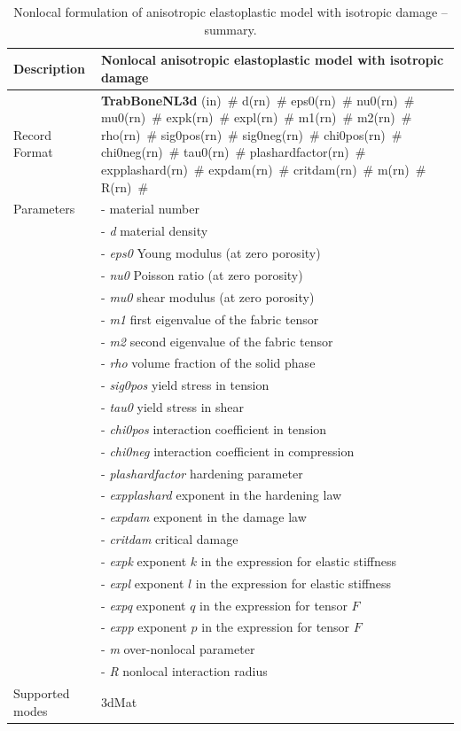 \documentclass[a4paper]{article}
\newcommand{\mbf}[1]{\mbox{\boldmath$#1$}}
\newcommand{\descitem}[1]{{\noindent \bf #1}}
\newcommand{\elemparam}[2]{{{#1\tiny (#2)}~\#}}
\newcommand{\param}[1]{{\it #1}}
\begin{document}
\begin{table}[!htb]
\begin{tabular}{|l|p{9cm}|}
\hline
Description & Nonlocal anisotropic elastoplastic model with isotropic damage\\
\hline
Record Format & \descitem{TrabBoneNL3d}  \elemparam{}{in}
\elemparam{d}{rn} \elemparam{eps0}{rn} \elemparam{nu0}{rn} \elemparam{mu0}{rn} \elemparam{expk}{rn} \elemparam{expl}{rn} \elemparam{m1}{rn} \elemparam{m2}{rn} \elemparam{rho}{rn}
\elemparam{sig0pos}{rn} \elemparam{sig0neg}{rn} \elemparam{chi0pos}{rn} \elemparam{chi0neg}{rn} \elemparam{tau0}{rn} \elemparam{plashardfactor}{rn} \elemparam{expplashard}{rn} \elemparam{expdam}{rn} \elemparam{critdam}{rn} \elemparam{m}{rn} \elemparam{R}{rn}\\
Parameters &- \param{} material number\\
&- \param{d} material density\\
&- \param{eps0} Young modulus (at zero porosity)\\
&- \param{nu0} Poisson ratio (at zero porosity)\\
&- \param{mu0} shear modulus (at zero porosity)\\
&- \param{m1} first eigenvalue of the fabric tensor\\
&- \param{m2} second eigenvalue of the fabric tensor\\
&- \param{rho} volume fraction of the solid phase\\
&- \param{sig0pos} yield stress in tension\\
&- \param{tau0} yield stress in shear\\
&- \param{chi0pos} interaction coefficient in tension\\
&- \param{chi0neg} interaction coefficient in compression\\
&- \param{plashardfactor} hardening parameter\\
&- \param{expplashard} exponent in the hardening law\\
&- \param{expdam} exponent in the damage law\\
&- \param{critdam} critical damage\\
&- \param{expk} exponent $k$ in the expression for elastic stiffness\\
&- \param{expl} exponent $l$ in the expression for elastic stiffness\\
&- \param{expq} exponent $q$ in the expression for tensor \mbf{F}\\
&- \param{expp} exponent $p$ in the expression for tensor \mbf{F}\\
&- \param{m} over-nonlocal parameter\\
&- \param{R} nonlocal interaction radius\\
Supported modes& 3dMat\\
\hline
\end{tabular}
\caption{Nonlocal formulation of anisotropic elastoplastic model with isotropic damage -- summary.}
\label{trabboneNl_table}
\end{table}
\end{document}
